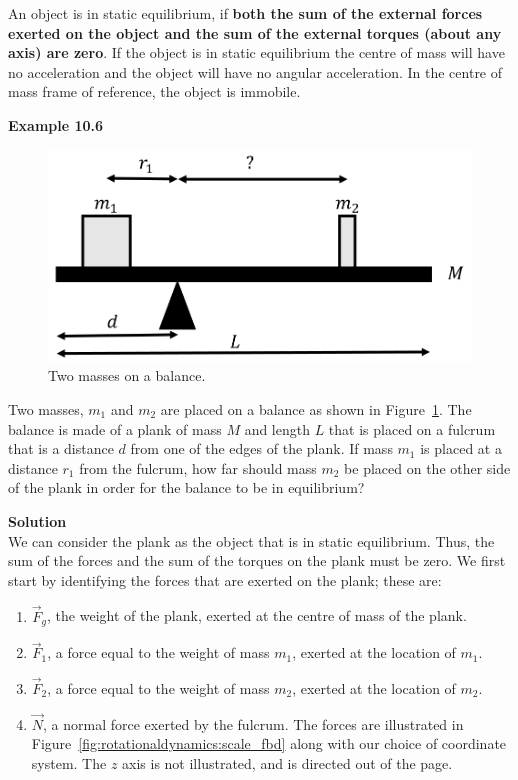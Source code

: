 An object is in static equilibrium, if \textbf{both the sum of the external forces exerted on the object and the sum of the external torques (about any axis) are zero}. If the object is in static equilibrium the centre of mass will have no acceleration and the object will have no angular acceleration. In the centre of mass frame of reference, the object is immobile.

\begin{framed}
\textbf{Example 10.6}\\
\begin{figure}[!htbp]
\centering
\includegraphics[width=0.625\linewidth]{files/scale-7513564151b88bb65ea62810e588cb41.png}
\caption[]{Two masses on a balance.}
\label{fig:rotationaldynamics:scale}
\end{figure}

Two masses, $m_1$ and $m_2$ are placed on a balance as shown in Figure~\ref{fig:rotationaldynamics:scale}. The balance is made of a plank of mass $M$ and length $L$ that is placed on a fulcrum that is a distance $d$ from one of the edges of the plank. If mass $m_1$ is placed at a distance $r_1$ from the fulcrum, how far should mass $m_2$ be placed on the other side of the plank in order for the balance to be in equilibrium?

\begin{framed}
\textbf{Solution}\\
We can consider the plank as the object that is in static equilibrium. Thus, the sum of the forces and the sum of the torques on the plank must be zero. We first start by identifying the forces that are exerted on the plank; these are:

\begin{enumerate}
\item $\vec F_g$, the weight of the plank, exerted at the centre of mass of the plank.
\item $\vec F_1$, a force equal to the weight of mass $m_1$, exerted at the location of $m_1$.
\item $\vec F_2$, a force equal to the weight of mass $m_2$, exerted at the location of $m_2$.
\item $\vec N$, a normal force exerted by the fulcrum.
The forces are illustrated in Figure~\ref{fig:rotationaldynamics:scale_fbd} along with our choice of coordinate system. The $z$ axis is not illustrated, and is directed out of the page.
\end{enumerate}


\end{framed}
\end{framed}
